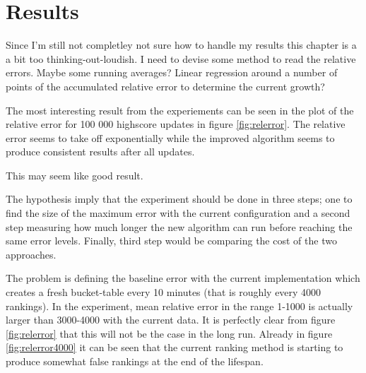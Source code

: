 \chapter{Results}

\begin{mdframed}[backgroundcolor=red,innerleftmargin=15pt,leftmargin=-10pt,rightmargin=-10pt, innerrightmargin=15pt,innertopmargin=10pt,innerbottommargin=10pt, fontcolor=white, skipabove=20pt, linewidth=0]
  Since I'm still not completley not sure how to handle my results this chapter is a a bit too thinking-out-loudish. I need to devise some method to read the relative errors. Maybe some running averages? Linear regression around a number of points of the accumulated relative error to determine the current growth?
\end{mdframed}

The most interesting result from the experiements can be seen in the plot of the relative error for 100 000 highscore updates in figure \ref{fig:relerror}. The relative error seems to take off exponentially while the improved algorithm seems to produce consistent results after all updates.

This may seem like good result.

The hypothesis imply that the experiment should be done in three steps; one to find the size of the maximum error with the current configuration and a second step measuring how much longer the new algorithm can run before reaching the same error levels. Finally, third step would be comparing the cost of the two approaches.

The problem is defining the baseline error with the current implementation which creates a fresh bucket-table every 10 minutes (that is roughly every 4000 rankings). In the experiment, mean relative error in the range 1-1000 is actually larger than 3000-4000 with the current data. It is perfectly clear from figure \ref{fig:relerror} that this will not be the case in the long run. Already in figure \ref{fig:relerror4000} it can be seen that the current ranking method is starting to produce somewhat false rankings at the end of the lifespan.

